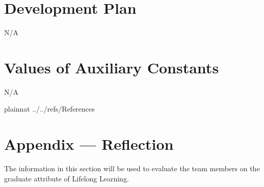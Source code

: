 \documentclass[12pt]{article}
\begin{document}



\section{Development Plan}

N/A

\section{Values of Auxiliary Constants}
N/A

\newpage

 {plainnat}
 {../../refs/References}

\newpage
\section*{Appendix --- Reflection}


The information in this section will be used to evaluate the team members on the
graduate attribute of Lifelong Learning.  


\end{document}
